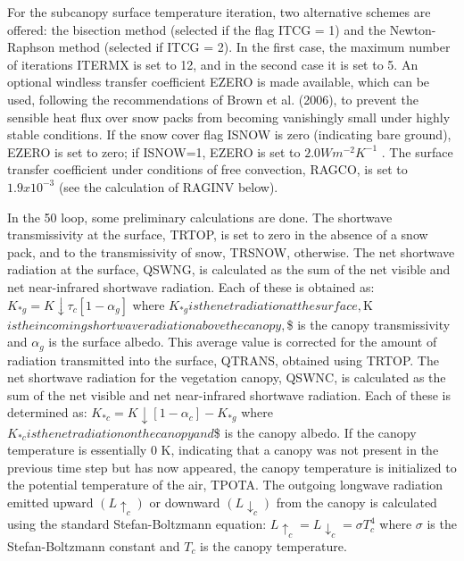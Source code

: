 For the subcanopy surface temperature iteration, two alternative schemes are offered\+: the bisection method (selected if the flag I\+T\+C\+G = 1) and the Newton-\/\+Raphson method (selected if I\+T\+C\+G = 2). In the first case, the maximum number of iterations I\+T\+E\+R\+M\+X is set to 12, and in the second case it is set to 5. An optional windless transfer coefficient E\+Z\+E\+R\+O is made available, which can be used, following the recommendations of Brown et al. (2006), to prevent the sensible heat flux over snow packs from becoming vanishingly small under highly stable conditions. If the snow cover flag I\+S\+N\+O\+W is zero (indicating bare ground), E\+Z\+E\+R\+O is set to zero; if I\+S\+N\+O\+W=1, E\+Z\+E\+R\+O is set to $2.0 W m^{-2} K^{-1}$ . The surface transfer coefficient under conditions of free convection, R\+A\+G\+C\+O, is set to $1.9 x 10^{-3}$ (see the calculation of R\+A\+G\+I\+N\+V below).

In the 50 loop, some preliminary calculations are done. The shortwave transmissivity at the surface, T\+R\+T\+O\+P, is set to zero in the absence of a snow pack, and to the transmissivity of snow, T\+R\+S\+N\+O\+W, otherwise. The net shortwave radiation at the surface, Q\+S\+W\+N\+G, is calculated as the sum of the net visible and net near-\/infrared shortwave radiation. Each of these is obtained as\+: $K_{*g} = K \downarrow \tau_c [1 - \alpha_g ]$ where $K_{*g} is the net radiation at the surface, $K  $ is the incoming shortwave radiation above the canopy, $\$ is the canopy transmissivity and $\alpha_g$ is the surface albedo. This average value is corrected for the amount of radiation transmitted into the surface, Q\+T\+R\+A\+N\+S, obtained using T\+R\+T\+O\+P. The net shortwave radiation for the vegetation canopy, Q\+S\+W\+N\+C, is calculated as the sum of the net visible and net near-\/infrared shortwave radiation. Each of these is determined as\+: $K_{*c} = K \downarrow [1 - \alpha_c ] - K_{*g}$ where $K_{*c} is the net radiation on the canopy and $\$ is the canopy albedo. If the canopy temperature is essentially 0 K, indicating that a canopy was not present in the previous time step but has now appeared, the canopy temperature is initialized to the potential temperature of the air, T\+P\+O\+T\+A. The outgoing longwave radiation emitted upward $(L \uparrow_c )$ or downward $(L \downarrow_c )$ from the canopy is calculated using the standard Stefan-\/\+Boltzmann equation\+: $L \uparrow_c = L \downarrow_c = \sigma T_c^4$ where $\sigma$ is the Stefan-\/\+Boltzmann constant and $T_c$ is the canopy temperature.

